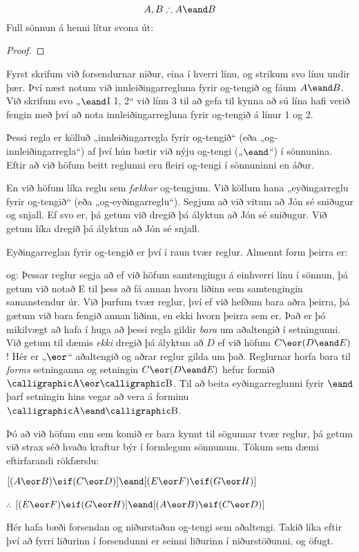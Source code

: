 $$A, B \therefore A \eand B$$ Full sönnun á henni lítur svona út:
\begin{proof}
	\close
	 
\end{proof} Fyrst skrifum við forsendurnar niður, eina í hverri línu, og strikum svo línu undir þær. Því næst notum við innleiðingarregluna fyrir og-tengið og fáum $A \eand B$. Við skrifum svo „$\eand$I 1, 2“ við línu 3 til að gefa til kynna að sú lína hafi verið fengin með því að nota innleiðingarregluna fyrir og-tengið á línur 1 og 2.

Þessi regla er kölluð „innleiðingarregla fyrir og-tengið“ (eða „og-innleiðingarregla“) af því hún bætir við nýju og-tengi („$\eand$“) í sönnunina. Eftir að við höfum beitt reglunni eru fleiri og-tengi í sönnuninni en áður.

En við höfum líka reglu sem \emph{fækkar} og-tengjum. Við köllum hana „eyðingarreglu fyrir og-tengið“ (eða „og-eyðingarreglu“). Segjum að við vitum að Jón sé sniðugur og snjall. Ef svo er, þá getum við dregið þá ályktun að Jón sé sniðugur. Við getum líka dregið þá ályktun að Jón sé snjall.

Eyðingarreglan fyrir og-tengið er því í raun tvær reglur. Almennt form þeirra er:

og:
Þessar reglur segja að ef við höfum samtengingu á einhverri línu í sönnun, þá getum við notað {\eand}E til þess að fá annan hvorn liðinn sem samtengingin samanstendur úr. Við þurfum tvær reglur, því ef við hefðum bara aðra þeirra, þá gætum við bara fengið annan liðinn, en ekki hvorn þeirra sem er. Það er þó mikilvægt að hafa í huga að þessi regla gildir \emph{bara} um aðaltengið í setningunni. Við getum til dæmis \emph{ekki} dregið þá ályktun að $D$ ef við höfum $C \eor (D \eand E)$! Hér er „$\eor$“ aðaltengið og aðrar reglur gilda um það. Reglurnar horfa bara til \emph{forms} setninganna og setningin  $C \eor (D \eand E)$ hefur formið $\meta{A} \eor \meta{B}$. Til að beita eyðingarreglunni fyrir $\eand$ þarf setningin hins vegar að vera á forminu $\meta{A} \eand \meta{B}$.

Þó að við höfum enn sem komið er bara kynnt til sögunnar tvær reglur, þá getum við strax séð hvaða kraftur býr í formlegum sönnunum. Tökum sem dæmi eftirfarandi rökfærslu:
\begin{earg}
\item[] $[(A\eor B)\eif(C\eor D)] \eand [(E \eor F) \eif (G\eor H)]$
\item[$\therefore$] $[(E \eor F) \eif (G\eor H)] \eand [(A\eor B)\eif(C\eor D)]$
\end{earg}
Hér hafa bæði forsendan og niðurstaðan og-tengi sem aðaltengi. Takið líka eftir því að fyrri liðurinn í forsendunni er seinni liðurinn í niðurstöðunni, og öfugt.


